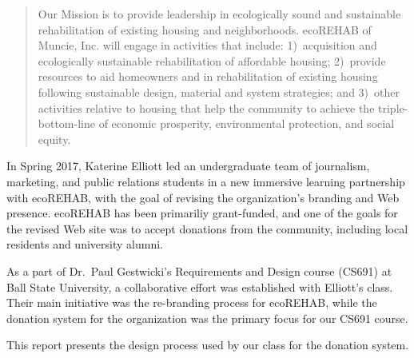 \documentclass[letter]{article}
\begin{document}
\begin{quote}
  Our Mission is to provide leadership in ecologically sound and
  sustainable rehabilitation of existing housing and
  neighborhoods. ecoREHAB of Muncie, Inc. will engage in activities
  that include: 1)~acquisition and ecologically sustainable
  rehabilitation of affordable housing; 2)~provide resources to aid
  homeowners and in rehabilitation of existing housing following
  sustainable design, material and system strategies; and 3)~other
  activities relative to housing that help the community to achieve
  the triple-bottom-line of economic prosperity, environmental
  protection, and social equity.
\end{quote}

In Spring 2017, Katerine Elliott led an undergraduate team of journalism,
marketing, and public relations students in a new immersive learning
partnership with ecoREHAB, with the goal of revising the organization's
branding and Web presence.
ecoREHAB has been primariliy grant-funded, and one of the 
goals for the revised Web site was to accept donations from
the community, including local residents and university alumni.

As a part of Dr.\ Paul Gestwicki's Requirements and Design course (CS691)
at Ball State University, a collaborative effort was established with
Elliott's class. 
Their main initiative was the re-branding process for
ecoREHAB, while the donation system for the organization was the
primary focus for our CS691 course.  

This report presents the design process used by our class for the
donation system.
\end{document}
